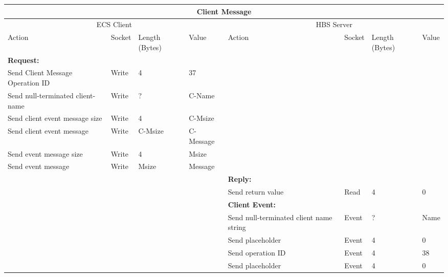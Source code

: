 \bigskip
\small
\begin{tabular}{|p{1.2in}|p{.4in}|p{.4in}|p{.5in}|p{1.2in}|p{.4in}|p{.4in}|p{.5in} |} \hline
\multicolumn{8}{|c|}{{\bf Client Message}} \\ \hline
\multicolumn{4}{|c|}{ECS Client} & \multicolumn{4}{|c|}{HBS Server} \\ \hline
Action            & Socket & Length  
                            (Bytes)& Value & Action       & Socket & Length 
                                                                    (Bytes)& Value \\ \hline
\multicolumn{4}{|l}{{\bf Request:}}&\multicolumn{4}{|l|}{~} \\ \hline
Send Client Message Operation ID  & Write  & 4     & 37     &              &        &       &       \\ \hline
Send null-terminated client-name      & Write  & ?     &  C-Name &           &        &       &       \\ \hline
Send client event
message size      & Write  & 4     &  C-Msize &         &        &       &       \\ \hline
Send client event message
                  & Write  &  C-Msize  &  C-Message &     &        &       &       \\ \hline
Send event
message size      & Write  & 4     &  Msize &         &        &       &       \\ \hline
Send event message
                  & Write  &  Msize  &  Message &     &        &       &       \\ \hline
\multicolumn{4}{|l}{~}&\multicolumn{4}{|l|}{{\bf Reply:}} \\ \hline
                  &        &       &       & Send return
                                             value        & Read   &  4    & 0       \\ \hline
\multicolumn{4}{|l}{~}&\multicolumn{4}{|l|}{{\bf Client Event:}} \\ \hline
                  &        &       &       & Send null-terminated client
                                             name string  & Event  &  ?    & Name  \\ \hline
                  &        &       &       & Send placeholder  & Event  &   4   &   0    \\  \hline
                  &        &       &       & Send operation 
                                             ID           & Event  &   4   &  38   \\ \hline
                  &        &       &       & Send placeholder     & Event  &   4   &  0    \\ \hline

\end{tabular}
